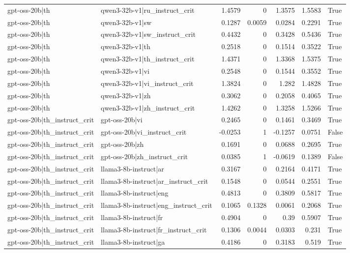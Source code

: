 \begin{table}
\begin{tabular}{l l r r r r l}
gpt-oss-20b|th & qwen3-32b-v1|ru_instruct_crit & 1.4579 & 0 & 1.3575 & 1.5583 & True \\
gpt-oss-20b|th & qwen3-32b-v1|sw & 0.1287 & 0.0059 & 0.0284 & 0.2291 & True \\
gpt-oss-20b|th & qwen3-32b-v1|sw_instruct_crit & 0.4432 & 0 & 0.3428 & 0.5436 & True \\
gpt-oss-20b|th & qwen3-32b-v1|th & 0.2518 & 0 & 0.1514 & 0.3522 & True \\
gpt-oss-20b|th & qwen3-32b-v1|th_instruct_crit & 1.4371 & 0 & 1.3368 & 1.5375 & True \\
gpt-oss-20b|th & qwen3-32b-v1|vi & 0.2548 & 0 & 0.1544 & 0.3552 & True \\
gpt-oss-20b|th & qwen3-32b-v1|vi_instruct_crit & 1.3824 & 0 & 1.282 & 1.4828 & True \\
gpt-oss-20b|th & qwen3-32b-v1|zh & 0.3062 & 0 & 0.2058 & 0.4065 & True \\
gpt-oss-20b|th & qwen3-32b-v1|zh_instruct_crit & 1.4262 & 0 & 1.3258 & 1.5266 & True \\
gpt-oss-20b|th_instruct_crit & gpt-oss-20b|vi & 0.2465 & 0 & 0.1461 & 0.3469 & True \\
gpt-oss-20b|th_instruct_crit & gpt-oss-20b|vi_instruct_crit & -0.0253 & 1 & -0.1257 & 0.0751 & False \\
gpt-oss-20b|th_instruct_crit & gpt-oss-20b|zh & 0.1691 & 0 & 0.0688 & 0.2695 & True \\
gpt-oss-20b|th_instruct_crit & gpt-oss-20b|zh_instruct_crit & 0.0385 & 1 & -0.0619 & 0.1389 & False \\
gpt-oss-20b|th_instruct_crit & llama3-8b-instruct|ar & 0.3167 & 0 & 0.2164 & 0.4171 & True \\
gpt-oss-20b|th_instruct_crit & llama3-8b-instruct|ar_instruct_crit & 0.1548 & 0 & 0.0544 & 0.2551 & True \\
gpt-oss-20b|th_instruct_crit & llama3-8b-instruct|eng & 0.4813 & 0 & 0.3809 & 0.5817 & True \\
gpt-oss-20b|th_instruct_crit & llama3-8b-instruct|eng_instruct_crit & 0.1065 & 0.1328 & 0.0061 & 0.2068 & True \\
gpt-oss-20b|th_instruct_crit & llama3-8b-instruct|fr & 0.4904 & 0 & 0.39 & 0.5907 & True \\
gpt-oss-20b|th_instruct_crit & llama3-8b-instruct|fr_instruct_crit & 0.1306 & 0.0044 & 0.0303 & 0.231 & True \\
gpt-oss-20b|th_instruct_crit & llama3-8b-instruct|ga & 0.4186 & 0 & 0.3183 & 0.519 & True \\

\end{tabular}
\end{table}
